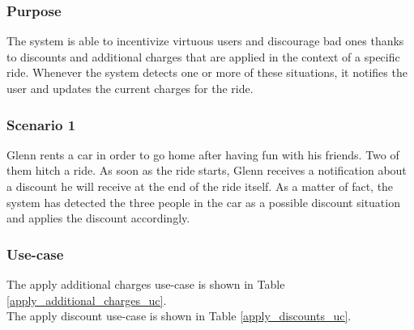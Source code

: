 \subsubsection{Purpose}
The system is able to incentivize virtuous users and discourage bad ones thanks to discounts and additional charges that are applied in the context of a specific ride. Whenever the system detects one or more of these situations, it notifies the user and updates the current charges for the ride.

\subsubsection{Scenario 1}
Glenn rents a car in order to go home after having fun with his friends. Two of them hitch a ride. As soon as the ride starts, Glenn receives a notification about a discount he will receive at the end of the ride itself. As a matter of fact, the system has detected the three people in the car as a possible discount situation and applies the discount accordingly.

\subsubsection{Use-case}
The apply additional charges use-case is shown in Table \ref{apply_additional_charges_uc}. \\
The apply discount use-case is shown in Table \ref{apply_discounts_uc}.

